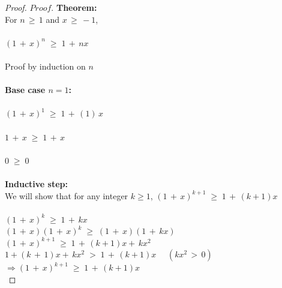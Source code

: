 \documentclass{amsart}
\theoremstyle{definition}
\theoremstyle{Exercise}
\theoremstyle{remark}
\theoremstyle{rule}
\numberwithin{equation}{section}
\begin{document}
\begin{proof}
\renewcommand{\qedsymbol}{\rule{0.7em}{0.7em}}
$Proof.$ \textbf{Theorem:}\\
For $n\, \geq \, 1$ and $x\, \geq\,-1$,\\\\
$(1\,+\,x)^n\;\geq\;1\,+\,nx$\\\\
Proof by induction on $n$\\\\
\textbf{Base case $n=1$:}\\\\
$(1\,+\,x)^1\;\geq\;1\,+\,(1)\,x$\\\\
$1\,+\,x\;\geq\;1\,+\,x$\\\\
$0\;\geq\;0$\\\\
\textbf{Inductive step:}\\
We will show that for any integer $k\geq1$, $(1\,+\,x)^{k+1}\;\geq\;1\,+\,(k+1)x$\\\\
$(1\,+\,x)^k\;\geq\;1\,+\,kx$\\
$(1\,+\,x)(1\,+\,x)^{k}\;\geq\;(1\,+\,x)(1\,+\,kx)$\\
$(1\,+\,x)^{k+1}\;\geq\;1\,+\,(k+1)x+\,kx^2$\\
$1+(k\,+\,1)x+\,kx^2\;>\;1\,+\,(k+1)x\,\,\,\,\,\,\,\,(kx^2\,>\,0)$\\
$\Rightarrow (1\,+\,x)^{k+1}\;\geq\;1\,+\,(k+1)x$\\
\end{proof}


\newpage
\end{document}
